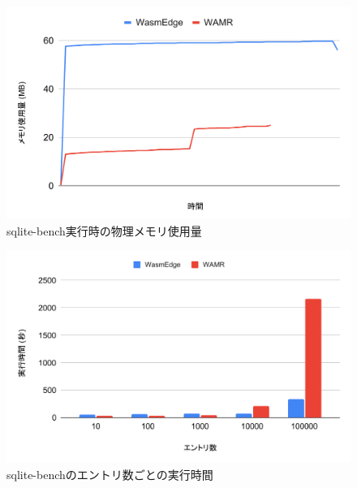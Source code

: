 \begin{figure}[t]
    \centering
    \includegraphics*[width=1\linewidth]{images/wasm_rss}
    \caption{sqlite-bench実行時の物理メモリ使用量}
    \label{fig:sqlite-bench-rss}
\end{figure}

\begin{figure}[t]
    \centering
    \includegraphics*[width=1\linewidth]{images/wasm_time}
    \caption{sqlite-benchのエントリ数ごとの実行時間}
    \label{fig:sqlite-bench-time}
\end{figure}

